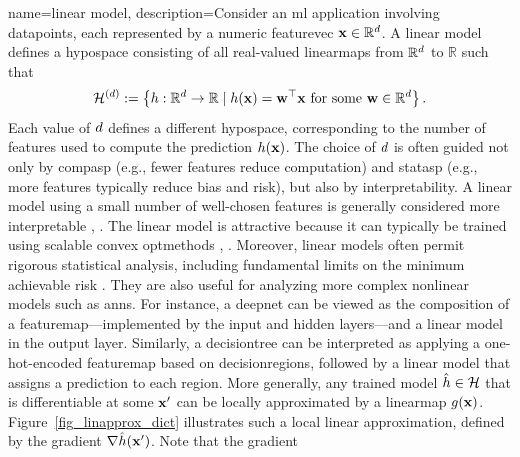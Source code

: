 {name={linear model}, 
	description={Consider an \gls{ml} application involving \glspl{datapoint}, each represented 
		by a numeric \gls{featurevec} ${\bf x} \in \mathbb{R}^{d}$. A linear \gls{model} defines 
		a \gls{hypospace} consisting of all real-valued \glspl{linearmap} from $\mathbb{R}^{d}$ to $\mathbb{R}$ such that
		\begin{equation}
			\nonumber
			\label{equ_def_lin_model_hypspace_dict}
			\mathcal{H}^{(d)} := \left\{ h: \mathbb{R}^{d} \rightarrow \mathbb{R} \mid h({\bf x}) = {\bf w}^{\top} {\bf x} \text{ for some } {\bf w} \in \mathbb{R}^{d} \right\}.
		\end{equation}
		Each value of $d$ defines a different \gls{hypospace}, corresponding to the number of 
		\glspl{feature} used to compute the \gls{prediction} $h({\bf x})$. The choice of 
		$d$ is often guided not only by \gls{compasp} (e.g., fewer features reduce computation) and 
		\gls{statasp} (e.g., more features typically reduce \gls{bias} and \gls{risk}), but also by \gls{interpretability}. 
		A linear \gls{model} using a small number of well-chosen \glspl{feature} is generally considered 
		more interpretable \cite{rudin2019stop}, \cite{Ribeiro2016}.
		The linear \gls{model} is attractive because it can typically be trained using scalable \gls{convex} \glspl{optmethod} \cite{hastie01statisticallearning}, \cite{BertsekasNonLinProgr}. 
		Moreover, linear \glspl{model} often permit rigorous 
		statistical analysis, including fundamental limits on the \gls{minimum} achievable \gls{risk} \cite{Wain2019}. 
		They are also useful for analyzing more complex nonlinear \glspl{model} such as \glspl{ann}. For instance, 
		a \gls{deepnet} can be viewed as the composition of a \gls{featuremap}—implemented by the input and 
		hidden layers—and a linear \gls{model} in the output layer. Similarly, a \gls{decisiontree} can be interpreted 
		as applying a one-hot-encoded \gls{featuremap} based on \glspl{decisionregion}, followed by a linear 
		\gls{model} that assigns a \gls{prediction} to each region.
		More generally, any trained \gls{model} $\hat{h} \in \mathcal{H}$ that is 
		\gls{differentiable} at some ${\bf x}'$ can be locally approximated by a \gls{linearmap} 
		$g({\bf x})$. Figure~\ref{fig_linapprox_dict} illustrates such a local linear approximation, 
		defined by the \gls{gradient} $\nabla \hat{h}({\bf x}')$. Note that the \gls{gradient} 
}}
